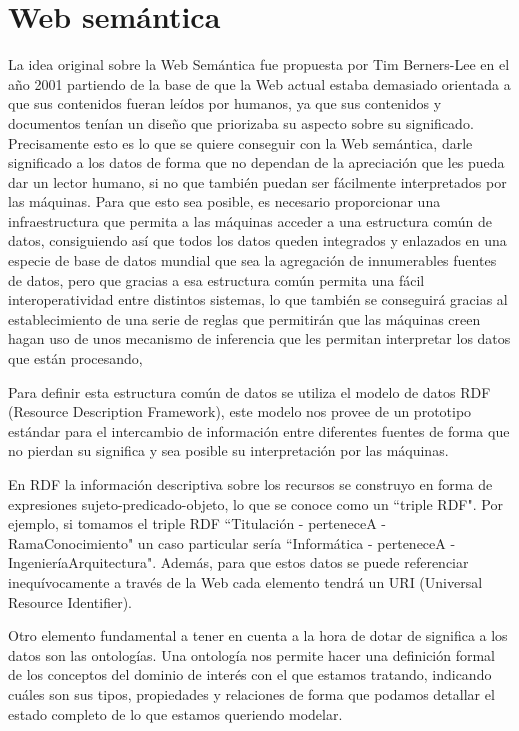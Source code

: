 \section{Web semántica}
La idea original sobre la Web Semántica fue propuesta por Tim Berners-Lee en el año 2001 partiendo de la base de que la Web actual estaba demasiado orientada a que sus contenidos fueran leídos por humanos, ya que sus contenidos y documentos tenían un diseño que priorizaba su aspecto sobre su significado. Precisamente esto es lo que se quiere conseguir con la Web semántica, darle significado a los datos de forma que no dependan de la apreciación que les pueda dar un lector humano, si no que también puedan ser fácilmente interpretados por las máquinas. Para que esto sea posible, es necesario proporcionar una infraestructura que permita a las máquinas acceder a una estructura común de datos, consiguiendo así que todos los datos queden integrados y enlazados en una especie de base de datos mundial que sea la agregación de innumerables fuentes de datos, pero que gracias a esa estructura común permita una fácil interoperatividad entre distintos sistemas, lo que también se conseguirá gracias al establecimiento de una serie de reglas que permitirán que las máquinas creen hagan uso de unos mecanismo de inferencia que les permitan interpretar los datos que están procesando, 

\bigskip
Para definir esta estructura común de datos se utiliza el modelo de datos RDF (Resource Description Framework), este modelo nos provee de un prototipo estándar para el intercambio de información entre diferentes fuentes de forma que no pierdan su significa y sea posible su interpretación por las máquinas. 

\bigskip En RDF la información descriptiva sobre los recursos se construyo en forma de expresiones sujeto-predicado-objeto, lo que se conoce como un ``triple RDF". Por ejemplo, si tomamos el triple RDF ``Titulación - perteneceA - RamaConocimiento" un caso particular sería ``Informática - perteneceA - IngenieríaArquitectura". Además, para que estos datos se puede referenciar inequívocamente a través de la Web cada elemento tendrá un URI (Universal Resource Identifier).

\bigskip

Otro elemento fundamental a tener en cuenta a la hora de dotar de significa a los datos son las ontologías. Una ontología nos permite hacer una definición formal de los conceptos del dominio de interés con el que estamos tratando, indicando cuáles son sus tipos, propiedades y relaciones de forma que podamos detallar el estado completo de lo que estamos queriendo modelar.

